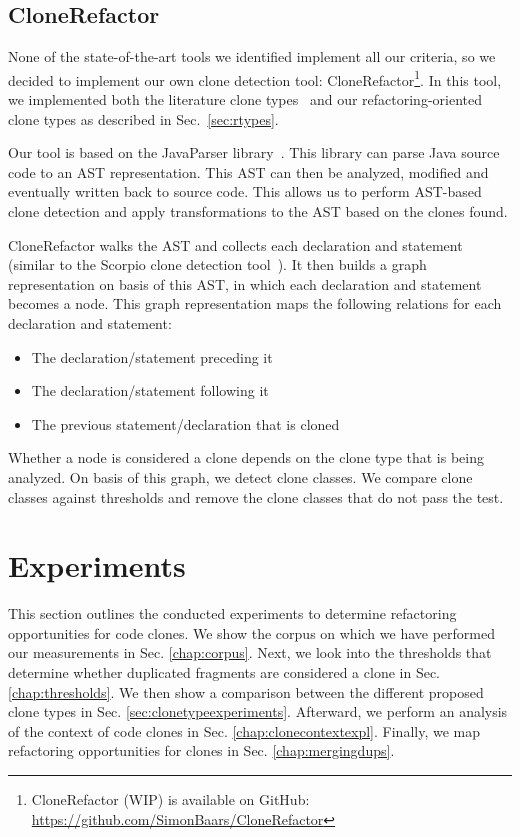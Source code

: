 \documentclass[a4paper]{article}
\begin{document}
\subsection{CloneRefactor}
None of the state-of-the-art tools we identified implement all our criteria, so we decided to implement our own clone detection tool: CloneRefactor\footnote{CloneRefactor (WIP) is available on GitHub: \url{https://github.com/SimonBaars/CloneRefactor}}. In this tool, we implemented both the literature clone types~\cite{roy2007survey} and our refactoring-oriented clone types as described in Sec.~\ref{sec:rtypes}. %


Our tool is based on the JavaParser library~\cite{tomassetti2017javaparser}. This library can parse Java source code to an AST representation. This AST can then be analyzed, modified and eventually written back to source code. This allows us to perform AST-based clone detection and apply transformations to the AST based on the clones found.

CloneRefactor walks the AST and collects each declaration and statement (similar to the Scorpio clone detection tool~\cite{higo2013revisiting}). It then builds a graph representation on basis of this AST, in which each declaration and statement becomes a node. This graph representation maps the following relations for each declaration and statement:

\begin{itemize}
  \item The declaration/statement preceding it
  \item The declaration/statement following it
  \item The previous statement/declaration that is cloned
\end{itemize}

Whether a node is considered a clone depends on the clone type that is being analyzed. On basis of this graph, we detect clone classes. We compare clone classes against thresholds and remove the clone classes that do not pass the test.

\section{Experiments}
This section outlines the conducted experiments to determine refactoring opportunities for code clones. We show the corpus on which we have performed our measurements in Sec. \ref{chap:corpus}. Next, we look into the thresholds that determine whether duplicated fragments are considered a clone in Sec. \ref{chap:thresholds}. We then show a comparison between the different proposed clone types in Sec. \ref{sec:clonetypeexperiments}. Afterward, we perform an analysis of the context of code clones in Sec. \ref{chap:clonecontextexpl}. Finally, we map refactoring opportunities for clones in Sec. \ref{chap:mergingdups}.
\end{document}
